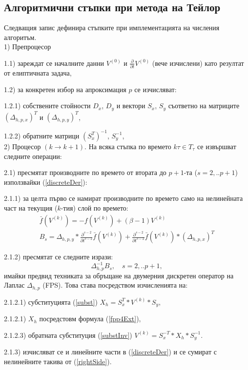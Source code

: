 \documentclass{article}
\newcommand{\be}{\begin{equation}}
\newcommand{\ee}{\end{equation}}
\newcommand{\rf}[1]{(\ref{#1})}
\begin{document}
\subsection{Алгоритмични стъпки при метода на Тейлор}

Следващия запис дефинира стъпките при имплементацията на числения алгоритъм.
\\
1) Препроцесор
\par
1.1) зареждат се началните данни $V^{(0)}$ и $\frac{\partial}{\partial t} V^{(0)}$ (вече изчислени) като резултат от елиптичната задача,
\par
1.2) за конкретен избор на апроксимация $p$ се изчисляват:
\par
1.2.1) собствените стойности $D_x$, $D_y$ и вектори $S_x$, $S_y$ съответно на матриците $(\Delta_{h,p,x})^T$ и $(\Delta_{h,p,y})^T$, 
\par
1.2.2) обратните матрици $(S_x^T)^{-1}$, $S_y^{-1}$,
\\
2) Процесор $(k \rightarrow k+1)$. На всяка стъпка по времето $k\tau \in T_\tau$ се извършват следните операции:
\par
2.1) пресмятат производните по времето от втората до $p+1$-та ($s=2,..p+1$) използвайки \rf{discreteDer}:
\par
2.1.1) за целта първо се намират производните по времето само на нелинейната част на текущия ($k$-тия) слой по времето:
\begin{align*}
\bar f (V^{(k)}) = -f(V^{(k)}) + (\beta-1)V^{(k)} \\
B_{s} = \Delta_{h,p,y} * \frac{\partial^{s-2}}{\partial t^{s-2}} \bar f (V^{(k)}) + \frac{\partial^{s-2}}{\partial t^{s-2}}  \bar f (V^{(k)}) * (\Delta_{h,p,x})^T 
\end{align*}
\par
2.1.2) пресмятат се следните изрази:
\be\label{rightSide}
\Delta_{h,p}^{-1} B_{s}, \quad s=2,..p+1,
\ee
имайки предвид техниката за обръщане на двумерния дискретен оператор на Лаплас $\Delta_{h,p}$ (FPS). Това става посредством изчисленията на:
\par
2.1.2.1) субституцията \rf{subst} $X_h = S_x^T * V^{(k)} * S_y$,
\par
2.1.2.1) $X_h$ посредстовм формула \rf{fpp4Ext},
\par
2.1.2.3) обратната субституция \rf{substInv} $V^{(k)} = S_x^{-T} * X_h * S_y^{-1}$.
\par
2.1.3) изчисляват се и линейните части в \rf{discreteDer} и се сумират с нелинейните такива от \rf{rightSide}.
\par
\end{document}
